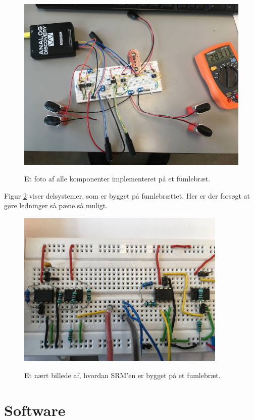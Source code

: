 \begin{figure}[H]
\centering
{\includegraphics[width=12cm]
{Figure/integrationstestBilleder1}}
\caption{Et foto af alle komponenter implementeret på et fumlebræt. }
\label{fig:integrationstestBilleder1}
\end{figure} 


Figur \ref{aaspectrumimplementering} viser delsystemer, som er bygget på fumlebrættet. Her er der forsøgt at gøre ledninger så pæne så muligt. 

\begin{figure}[H] 
\centering
{\includegraphics[width=10cm]
{Figure/aaspectrumimplementering}}
\caption{Et nært billede af, hvordan SRM'en er bygget på et fumlebræt.}
\label{aaspectrumimplementering}
\end{figure}



\pagebreak

\section{Software}

